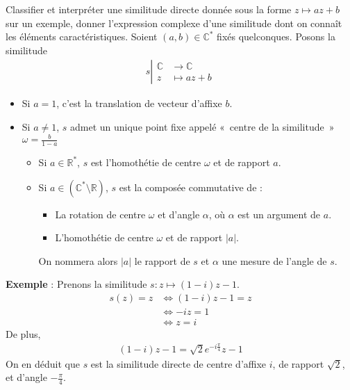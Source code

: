 \documentclass{article}
\renewenvironment{question_kholle}[2][ ]
{
	\subsection{\texorpdfstring{#2}{}}
	\notblank{#1}
	{
		\noindent #1
		\bigbreak
	}
	{}
	\begin{proof}
}
{
	\end{proof}
}
\begin{document}
\begin{question_kholle}{Classifier et interpréter une similitude directe donnée sous la forme $z \mapsto a z + b$ sur un exemple, donner l'expression complexe d'une similitude dont on connaît les éléments caractéristiques.}
  Soient $(a, b) \in \mathbb{C}^*$ fixés quelconques. Posons la similitude
  \begin{align*}
    s \left| \begin{array}{ll}
               \mathbb{C} & \to \mathbb{C}  \\
               z          & \mapsto a z + b
             \end{array}\right.
  \end{align*}
  \begin{itemize}[label=$\lozenge$]
    \item Si $a = 1$, c'est la translation de vecteur d'affixe $b$.
    \item Si $a \neq 1$, $s$ admet un unique point fixe appelé «~centre de la similitude~» $\omega = \frac{b}{1-a}$
          \begin{itemize}[label=$\star$]
            \item Si $a \in \mathbb{R}^*$, $s$ est l'homothétie de centre $\omega$ et de rapport $a$.
            \item Si $a \in (\mathbb{C}^* \setminus \mathbb{R})$, $s$ est la composée commutative de :
                  \begin{itemize}
                    \item La rotation de centre $\omega$ et d'angle $\alpha$, où $\alpha$ est un argument de $a$.
                    \item L'homothétie de centre $\omega$ et de rapport $|a|$.
                  \end{itemize}
                  On nommera alors $|a|$ le rapport de $s$ et $\alpha$ une mesure de l'angle de $s$.
          \end{itemize}
  \end{itemize}
  \textbf{Exemple} : Prenons la similitude $s: z \mapsto (1 - i) z - 1$.
  \begin{align*}
    s(z) = z & \iff (1 - i)z - 1 = z \\
             & \iff -iz = 1          \\
             & \iff z = i
  \end{align*}
  De plus,
  \begin{align*}
    (1 - i)z - 1 = \sqrt{2}e^{-i \frac{\pi}{4}}z - 1
  \end{align*}
  On en déduit que $s$ est la similitude directe de centre d'affixe $i$, de rapport $\sqrt{2}$, et d'angle $-\frac{\pi}{4}$.
\end{question_kholle}
\end{document}
